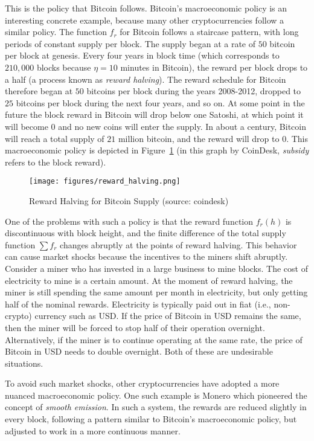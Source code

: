 This is the policy that Bitcoin follows.
Bitcoin's macroeconomic policy is an interesting concrete example, because
many other cryptocurrencies follow a similar policy. The function $f_r$
for Bitcoin follows a staircase pattern, with long periods of constant
supply per block. The supply began at a rate of $50$ bitcoin per block
at genesis. Every four years in block time (which corresponds to
$210{,}000$ blocks because $\eta = 10$ minutes in Bitcoin), the reward
per block drops to a half (a process known as \emph{reward halving}).
The reward schedule for Bitcoin therefore
began at $50$ bitcoins per block during the years 2008-2012, dropped
to $25$ bitcoins per block during the next four years, and so on. At
some point in the future the block reward in Bitcoin will drop below
one Satoshi, at which point it will become $0$ and no new coins will
enter the supply. In about a century, Bitcoin will reach a total supply
of $21$ million bitcoin, and the reward will drop to $0$. This
macroeconomic policy is depicted in Figure~\ref{fig.reward_halving}
(in this graph by CoinDesk, \emph{subsidy} refers to the block
reward).

\begin{figure}[ht]
    \centering
    \texttt{[image: figures/reward\_halving.png]}
    \caption{Reward Halving for Bitcoin Supply (source: coindesk)}
    \label{fig.reward_halving}
\end{figure}

One of the problems with such a policy is that the reward function
$f_r(h)$ is discontinuous with block height, and the finite difference
of the total supply function $\sum f_r$ changes abruptly at the points of
reward halving. This behavior can cause market shocks because the incentives
to the miners shift abruptly. Consider a miner who has invested in a large
business to mine blocks. The cost of electricity to mine is a certain
amount. At the moment of reward halving, the miner is still spending
the same amount per month in electricity, but only getting half of the
nominal rewards. Electricity is typically paid out in fiat (i.e., non-crypto)
currency such as USD. If the price of Bitcoin in USD remains the same, then
the miner will be forced to stop half of their operation overnight.
Alternatively, if the miner is to continue operating at the same rate,
the price of Bitcoin in USD needs to double overnight. Both of these
are undesirable situations.

To avoid such market shocks, other cryptocurrencies have adopted a more
nuanced macroeconomic policy. One such example is Monero which pioneered
the concept of \emph{smooth emission}. In such a system, the rewards
are reduced slightly in every block, following a pattern similar to
Bitcoin's macroeconomic policy, but adjusted to work in a more continuous
manner.

